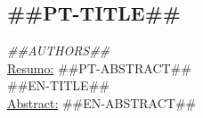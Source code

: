 \subsection*{##PT-TITLE##}
\vspace{-0.2cm}
\noindent
\textit{ ##AUTHORS##}\\[0.2cm]
\underline{Resumo:} ##PT-ABSTRACT##\\[0.5cm]
{\large ##EN-TITLE##}\\[0.2cm]
\underline{Abstract:} ##EN-ABSTRACT##
